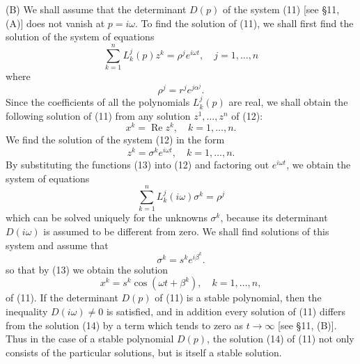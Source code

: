 \documentclass[10pt,a5paper]{book}
\theoremstyle{plain}
\theoremstyle{definition}
\theoremstyle{remark}
\begin{document}
(B) We shall assume that the determinant $D(p)$ of the system (11) [see §11, (A)] does not vanish at $p=i \omega$. To find the solution of (11), we shall first find the solution of the system of equations
\begin{equation*}
\sum_{k=1}^{n} L_{k}^{j}(p) z^{k}=\rho^{j} e^{i \omega t}, \quad j=1, \ldots, n \tag{12}
\end{equation*}
where
\[
\rho^{j}=r^{j} e^{j \alpha^{j}} .
\]
Since the coefficients of all the polynomials $L_{k}^{j}(p)$ are real, we shall obtain the following solution of (11) from any solution $z^{1}, \ldots, z^{n}$ of (12):
\[
x^{k}=\operatorname{Re} z^{k}, \quad k=1, \ldots, n .
\]
We find the solution of the system (12) in the form
\begin{equation*}
z^{k}=\sigma^{k} e^{i \omega t}, \quad k=1, \ldots, n . \tag{13}
\end{equation*}
By substituting the functions (13) into (12) and factoring out $e^{i \omega t}$, we obtain the system of equations
\[
\sum_{k=1}^{n} L_{k}^{j}(i \omega) \sigma^{k}=\rho^{j}
\]
which can be solved uniquely for the unknowns $\sigma^{k}$, because its determinant $D(i \omega)$ is assumed to be different from zero. We shall find solutions of this system and assume that
\[
\sigma^{k}=s^{k} e^{i \beta^{k}} .
\]
so that by (13) we obtain the solution
\begin{equation*}
x^{k}=s^{k} \cos \left(\omega t+\beta^{k}\right), \quad k=1, \ldots, n, \tag{14}
\end{equation*}
of (11). If the determinant $D(p)$ of (11) is a stable polynomial, then the inequality $D(i \omega) \neq 0$ is satisfied, and in addition every solution of (11) differs from the solution (14) by a term which tends to zero as $t \rightarrow \infty$ [see §11, (B)]. Thus in the case of a stable polynomial $D(p)$, the solution (14) of (11) not only consists of the particular solutions, but is itself a stable solution.
\end{document}

